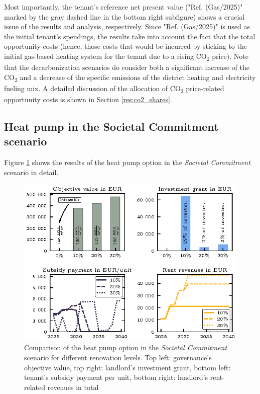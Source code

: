 Most importantly, the tenant's reference net present value ("Ref. (Gas/2025)" marked by the gray dashed line in the bottom right subfigure) shows a crucial issue of the results and analysis, respectively. Since "Ref. (Gas/2025)" is used as the initial tenant's spendings, the results take into account the fact that the total opportunity costs (hence, those costs that would be incurred by sticking to the initial gas-based heating system for the tenant due to a rising CO\textsubscript{2} price). Note that the decarbonization scenarios do consider both a significant increase of the CO\textsubscript{2} and a decrease of the specific emissions of the district heating and electricity fueling mix. A detailed discussion of the allocation of CO\textsubscript{2} price-related opportunity costs is shown in Section \ref{res:co2_shares}.

\subsection{Heat pump in the Societal Commitment scenario}\label{res:heat_pump}
Figure \ref{fig:retrofitting} shows the results of the heat pump option in the \textit{Societal Commitment} scenario in detail. 

\begin{figure}[h]
	\centering
	\includegraphics[width=1\linewidth]{figures/4_Results/fig_retrofitting/retrofitting.eps}
	\caption{Comparison of the heat pump option in the \textit{Societal Commitment} scenario for different renovation levels. Top left: governance's objective value, top right: landlord's investment grant, bottom left: tenant's subsidy payment per unit, bottom right: landlord's rent-related revenues in total}
	\label{fig:retrofitting}
\end{figure}

